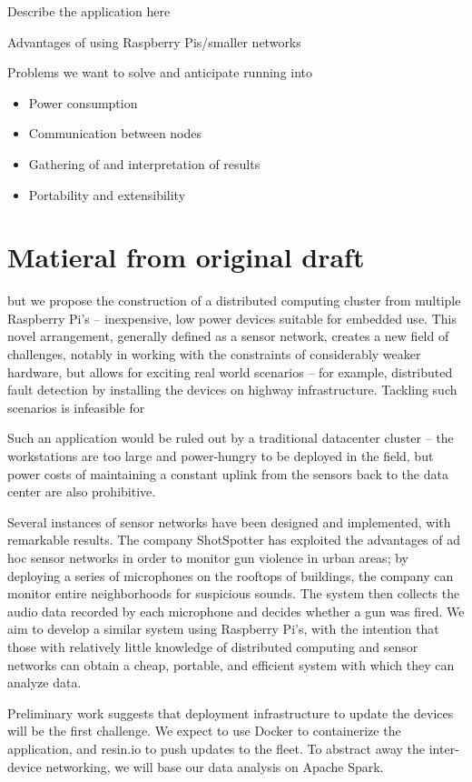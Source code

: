 \documentclass[12pt,draft]{report}
\begin{document}
Describe the application here

Advantages of using Raspberry Pis/smaller networks

Problems we want to solve and anticipate running into
\begin{itemize}
	\item Power consumption
	\item Communication between nodes
	\item Gathering of and interpretation of results
	\item Portability and extensibility
\end{itemize}

\section*{Matieral from original draft}
but we propose the construction of a distributed computing cluster from multiple Raspberry Pi’s -- inexpensive, low power devices suitable for embedded use. This novel arrangement, generally defined as a sensor network, creates a new field of challenges, notably in working with the constraints of considerably weaker hardware, but allows for exciting real world scenarios -- for example, distributed fault detection by installing the devices on highway infrastructure. Tackling such scenarios is infeasible for 



Such an application would be ruled out by a traditional datacenter cluster -- the workstations are too large and power-hungry to be deployed in the field, but power costs of maintaining a constant uplink from the sensors back to the data center are also prohibitive.

Several instances of sensor networks have been designed and implemented, with remarkable results. The company ShotSpotter has exploited the advantages of ad hoc sensor networks in order to monitor gun violence in urban areas; by deploying a series of microphones on the rooftops of buildings, the company can monitor entire neighborhoods for suspicious sounds. The system then collects the audio data recorded by each microphone and decides whether a gun was fired. We aim to develop a similar system using Raspberry Pi’s, with the intention that those with relatively little knowledge of distributed computing and sensor networks can obtain a cheap, portable, and efficient system with which they can analyze data. 

Preliminary work suggests that deployment infrastructure to update the devices will be the first challenge. We expect to use Docker to containerize the application, and resin.io to push updates to the fleet. To abstract away the inter-device networking, we will base our data analysis on Apache Spark.
\end{document}
